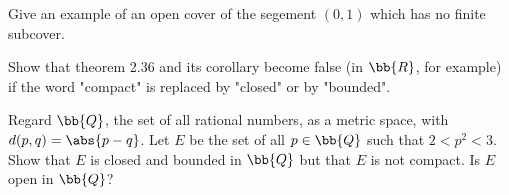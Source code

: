 \documentclass[12pt,letterpaper]{hmcpset}
\begin{document}
\begin{problem}[14.]
	Give an example of an open cover of the segement $(0, 1)$ which has no finite subcover.
\end{problem}

\begin{problem}[15.]
	Show that theorem 2.36 and its corollary become false (in $\bb{R}$, for example) if the word "compact" is replaced by "closed" or by "bounded".
\end{problem}

\begin{problem}[16.]
	Regard $\bb{Q}$, the set of all rational numbers, as a metric space, with \( d(p, q) = \abs{p - q} \). Let $E$ be the set of all \( p \in \bb{Q} \) such that \( 2 < p^2 < 3 \). Show that $E$ is closed and bounded in $\bb{Q}$ but that $E$ is not compact. Is $E$ open in $\bb{Q}$?
\end{problem}
\end{document}
